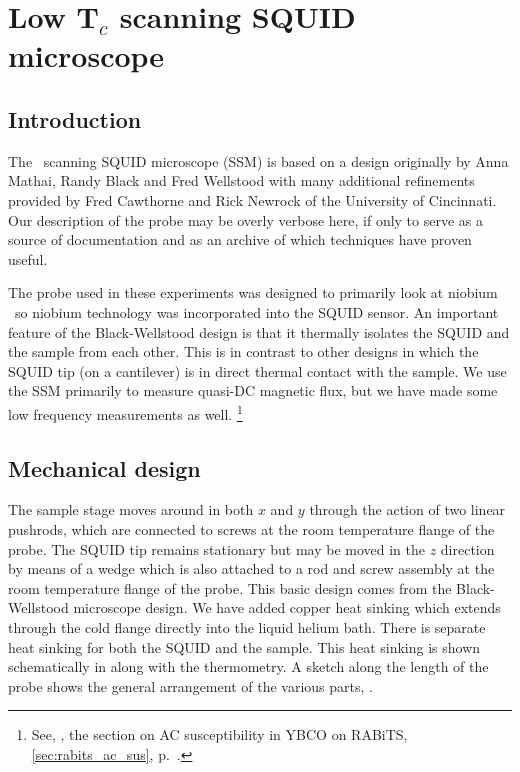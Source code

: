 


\chapter{Low T$_c$ scanning SQUID microscope}
\label{chap:ssm_appendix}

\section{Introduction}

The \lowtc\ scanning SQUID microscope (SSM) is based on a design
originally by Anna Mathai, Randy Black and Fred Wellstood
\cite{black_apl_62_2128_1993,black_phdthesis} 
with many additional refinements provided by Fred Cawthorne and Rick
Newrock of the University of Cincinnati\cite{newrock_addr}. 
Our description of the probe may be overly verbose here, if only 
to serve as a source of documentation and as an archive of which
techniques have proven useful. 

The probe used in these experiments was designed to primarily look at 
niobium \jjas\ so niobium technology was
incorporated into the SQUID sensor. An important feature of the 
Black-Wellstood design is that it thermally isolates the SQUID
and the sample from each other. This is in contrast to other
designs\cite{kirtley_apl_66_1138_1995} in which the SQUID tip
(on a cantilever)
is in direct thermal contact with the sample. 
We use the SSM primarily to measure quasi-DC magnetic flux, but
we have made some low frequency measurements as well.%
\footnote{See, \eg, the section on AC susceptibility in 
YBCO on RABiTS, \ref{sec:rabits_ac_sus}, p.~\pageref{sec:rabits_ac_sus}.}

\section{Mechanical design}
\label{ssm_mech_design}

The sample stage moves around in both $x$ and $y$ through the action of 
two linear pushrods, which are connected to screws at the room
temperature flange of the probe.
The SQUID tip remains stationary
but may be moved in the $z$ direction by means of a wedge which 
is also attached to a rod and screw assembly at the room temperature
flange of the probe. This basic design comes from the Black-Wellstood
microscope design\cite{black_phdthesis,black_apl_62_2128_1993}.
We have added copper heat sinking which extends through the cold
flange directly into the liquid helium bath. There is separate heat
sinking for both the SQUID and the sample. This heat sinking is 
shown schematically in  along with the
thermometry. 
A sketch along the length of the probe shows the general arrangement
of the various parts, .

